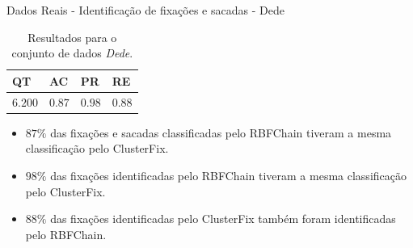\documentclass[10pt]{beamer}
\begin{document}
\begin{frame}{Dados Reais - Identificação de fixações e sacadas -  Dede}
    \begin{table}[ht!]
        \centering
        \caption{Resultados para o conjunto de dados \textit{Dede}.}
        \label{tbl:dede}
        \begin{tabular}{llll}

        \toprule
        QT              & AC                     & PR                     & RE         \\
        \midrule
        $6.200$         & $0.87$                 & $0.98$                 & $0.88$      \\
        \bottomrule

        \end{tabular}
    \end{table}

    \begin{itemize}
        \item \alert{$87\%$} das fixações e sacadas classificadas pelo RBFChain tiveram a mesma classificação pelo ClusterFix.
        \item \alert{$98\%$} das fixações identificadas pelo RBFChain tiveram a mesma classificação pelo ClusterFix.
        \item \alert{$88\%$} das fixações identificadas pelo ClusterFix também foram identificadas pelo RBFChain.
    \end{itemize}
\end{frame}
\end{document}
